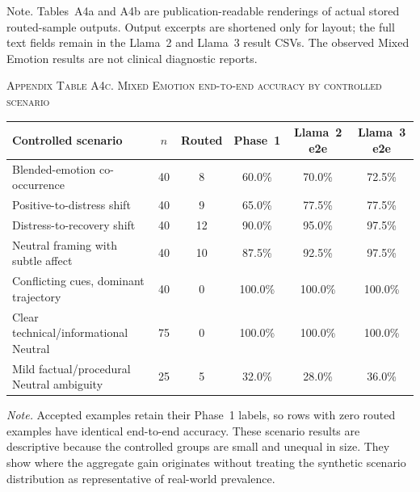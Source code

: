\documentclass{ieeeaccess}
\begin{document}
\par\medskip
\normalsize

Note. Tables~A4a and A4b are publication-readable renderings of actual stored routed-sample outputs. Output excerpts are shortened only for layout; the full text fields remain in the Llama~2 and Llama~3 result CSVs. The observed Mixed Emotion results are not clinical diagnostic reports.

\noindent\textsc{Appendix Table A4c. Mixed Emotion end-to-end accuracy by controlled scenario}\par
\label{tab:appendix-a4c-scenario-results}
\smallskip
\footnotesize
\setlength{\tabcolsep}{3.5pt}
\renewcommand{\arraystretch}{1.14}
\noindent\begin{tabularx}{\textwidth}{@{}>{\raggedright\arraybackslash}X c c c c c@{}}
\toprule
Controlled scenario & $n$ & Routed & Phase~1 & Llama~2 e2e & Llama~3 e2e \\
\midrule
Blended-emotion co-occurrence & 40 & 8 & 60.0\% & 70.0\% & 72.5\% \\
Positive-to-distress shift & 40 & 9 & 65.0\% & 77.5\% & 77.5\% \\
Distress-to-recovery shift & 40 & 12 & 90.0\% & 95.0\% & 97.5\% \\
Neutral framing with subtle affect & 40 & 10 & 87.5\% & 92.5\% & 97.5\% \\
Conflicting cues, dominant trajectory & 40 & 0 & 100.0\% & 100.0\% & 100.0\% \\
Clear technical/informational Neutral & 75 & 0 & 100.0\% & 100.0\% & 100.0\% \\
Mild factual/procedural Neutral ambiguity & 25 & 5 & 32.0\% & 28.0\% & 36.0\% \\
\bottomrule
\end{tabularx}
\par\smallskip
\noindent\footnotesize\textit{Note.} Accepted examples retain their Phase~1 labels, so rows with zero routed examples have identical end-to-end accuracy. These scenario results are descriptive because the controlled groups are small and unequal in size. They show where the aggregate gain originates without treating the synthetic scenario distribution as representative of real-world prevalence.\normalsize
\end{document}
